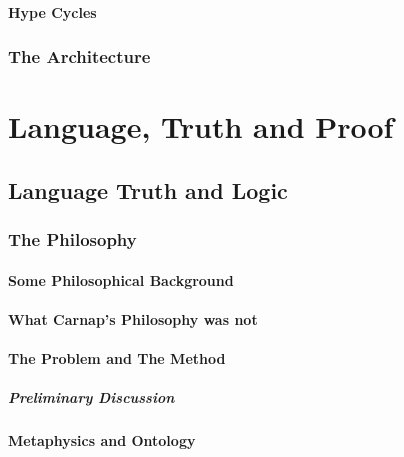 \documentclass[10pt,titlepage]{book}
\begin{document}
\subsection{Hype Cycles}\label{hype-cycles}

\section{The Architecture}\label{the-architecture}


\part{Language, Truth and Proof}\label{language,-truth-and-proof}

\chapter{Language Truth and Logic}\label{language-truth-and-logic}

\section{The Philosophy}\label{the-philosophy}

\subsection{Some Philosophical Background}\label{some-philosophical-background}

\subsection{What Carnap's Philosophy was not}\label{what-carnaps-philosophy-was-not}

\subsection{The Problem and The Method}\label{the-problem-and-the-method}

\subsubsection{Preliminary Discussion}\label{preliminary-discussion}

\subsection{Metaphysics and Ontology}\label{metaphysics-and-ontology}

\end{document}
